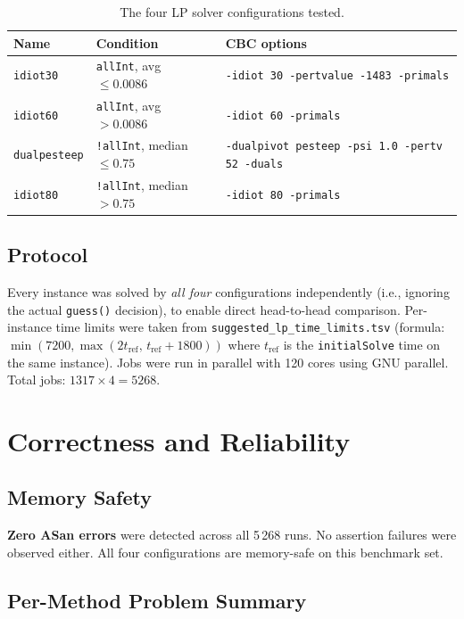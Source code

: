\documentclass[11pt,a4paper]{article}
\begin{document}
\begin{table}[h]
\centering
\caption{The four LP solver configurations tested.}
\begin{tabular}{llp{7.5cm}}
\toprule
\textbf{Name} & \textbf{Condition} & \textbf{CBC options} \\
\midrule
\texttt{idiot30} & \texttt{allInt}, avg $\le 0.0086$ &
  \texttt{-idiot 30 -pertvalue -1483 -primals} \\
\texttt{idiot60} & \texttt{allInt}, avg $> 0.0086$ &
  \texttt{-idiot 60 -primals} \\
\texttt{dualpesteep} & \texttt{!allInt}, median $\le 0.75$ &
  \texttt{-dualpivot pesteep -psi 1.0 -pertv 52 -duals} \\
\texttt{idiot80} & \texttt{!allInt}, median $> 0.75$ &
  \texttt{-idiot 80 -primals} \\
\bottomrule
\end{tabular}
\end{table}

\subsection{Protocol}
Every instance was solved by \emph{all four} configurations independently (i.e.,
ignoring the actual \texttt{guess()} decision), to enable direct head-to-head
comparison. Per-instance time limits were taken from
\texttt{suggested\_lp\_time\_limits.tsv} (formula:
$\min(7200,\max(2t_{\text{ref}},\, t_{\text{ref}}+1800))$ where $t_{\text{ref}}$
is the \texttt{initialSolve} time on the same instance). Jobs were run in
parallel with 120 cores using GNU parallel. Total jobs: $1317 \times 4 = 5268$.

\section{Correctness and Reliability}

\subsection{Memory Safety}
\textbf{Zero ASan errors} were detected across all 5\,268 runs. No assertion
failures were observed either. All four configurations are memory-safe on this
benchmark set.

\subsection{Per-Method Problem Summary}
\end{document}
